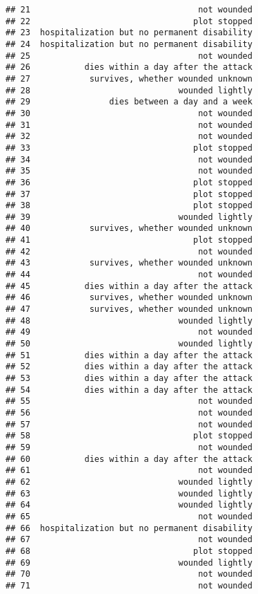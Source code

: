 \documentclass[
]{article}
\begin{document}
\begin{verbatim}
## 21                                  not wounded
## 22                                 plot stopped
## 23  hospitalization but no permanent disability
## 24  hospitalization but no permanent disability
## 25                                  not wounded
## 26           dies within a day after the attack
## 27            survives, whether wounded unknown
## 28                              wounded lightly
## 29                dies between a day and a week
## 30                                  not wounded
## 31                                  not wounded
## 32                                  not wounded
## 33                                 plot stopped
## 34                                  not wounded
## 35                                  not wounded
## 36                                 plot stopped
## 37                                 plot stopped
## 38                                 plot stopped
## 39                              wounded lightly
## 40            survives, whether wounded unknown
## 41                                 plot stopped
## 42                                  not wounded
## 43            survives, whether wounded unknown
## 44                                  not wounded
## 45           dies within a day after the attack
## 46            survives, whether wounded unknown
## 47            survives, whether wounded unknown
## 48                              wounded lightly
## 49                                  not wounded
## 50                              wounded lightly
## 51           dies within a day after the attack
## 52           dies within a day after the attack
## 53           dies within a day after the attack
## 54           dies within a day after the attack
## 55                                  not wounded
## 56                                  not wounded
## 57                                  not wounded
## 58                                 plot stopped
## 59                                  not wounded
## 60           dies within a day after the attack
## 61                                  not wounded
## 62                              wounded lightly
## 63                              wounded lightly
## 64                              wounded lightly
## 65                                  not wounded
## 66  hospitalization but no permanent disability
## 67                                  not wounded
## 68                                 plot stopped
## 69                              wounded lightly
## 70                                  not wounded
## 71                                  not wounded

\end{verbatim}
\end{document}
